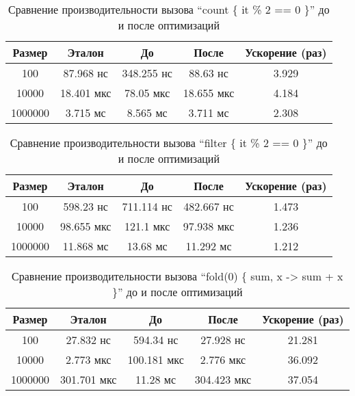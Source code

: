 \begin{table}[h]
\begin{center}
\begin{tabular}{|c|c|c|c|c|} \hline
Размер & Эталон & До & После & Ускорение (раз) \\ \hline
100 & 87.968 нс & 348.255 нс & 88.63 нс & 3.929\\ \hline
10000 & 18.401 мкс & 78.05 мкс & 18.655 мкс & 4.184\\ \hline
1000000 & 3.715 мс & 8.565 мс & 3.711 мс & 2.308\\ \hline
\end{tabular}
\caption{Сравнение производительности вызова ``count \{ it \% 2 == 0 \}'' до и после оптимизаций}
\label{bm:count:opt}
\end{center}
\end{table}

\begin{table}[h]
\begin{center}
\begin{tabular}{|c|c|c|c|c|} \hline
Размер & Эталон & До & После & Ускорение (раз) \\ \hline
100 & 598.23 нс & 711.114 нс & 482.667 нс & 1.473\\ \hline
10000 & 98.655 мкс & 121.1 мкс & 97.938 мкс & 1.236\\ \hline
1000000 & 11.868 мс & 13.68 мс & 11.292 мс & 1.212\\ \hline
\end{tabular}
\caption{Сравнение производительности вызова ``filter \{ it \% 2 == 0 \}'' до и после оптимизаций}
\label{bm:filter:opt}
\end{center}
\end{table}

\begin{table}[h]
\begin{center}
\begin{tabular}{|c|c|c|c|c|} \hline
Размер & Эталон & До & После & Ускорение (раз) \\ \hline
100 & 27.832 нс & 594.34 нс & 27.928 нс & 21.281\\ \hline
10000 & 2.773 мкс & 100.181 мкс & 2.776 мкс & 36.092\\ \hline
1000000 & 301.701 мкс & 11.28 мс & 304.423 мкс & 37.054\\ \hline
\end{tabular}
\caption{Сравнение производительности вызова ``fold(0) \{ sum, x -> sum + x \}'' до и после оптимизаций}
\label{bm:fold:opt}
\end{center}
\end{table}
